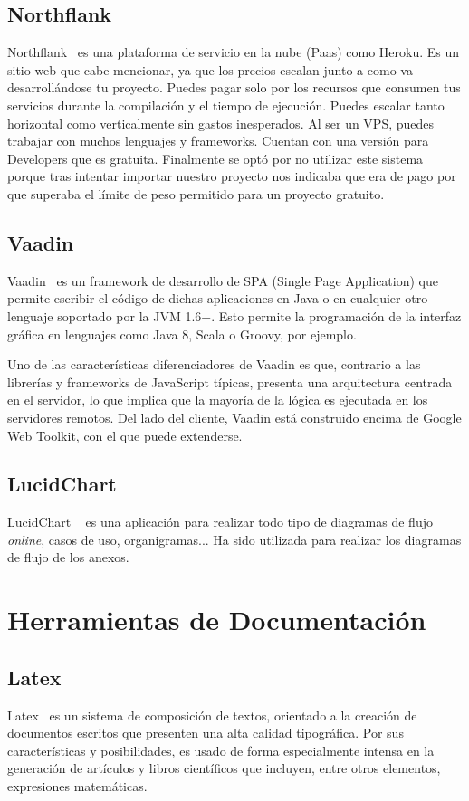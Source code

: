 \subsection{Northflank}
Northflank~\cite{Northflank} es una plataforma de servicio en la nube (Paas) como Heroku. Es un sitio web que cabe mencionar, ya que los precios escalan junto a como va desarrollándose tu proyecto. Puedes pagar solo por los recursos que consumen tus servicios durante la compilación y el tiempo de ejecución. Puedes escalar tanto horizontal como verticalmente sin gastos inesperados. Al ser un VPS, puedes trabajar con muchos lenguajes y frameworks. Cuentan con una versión para Developers que es gratuita. 
Finalmente se optó por no utilizar este sistema porque tras intentar importar nuestro proyecto nos indicaba que era de pago por que superaba el límite de peso permitido para un proyecto gratuito.

\subsection{Vaadin}
Vaadin~\cite{Vaadin} es un framework de desarrollo de SPA (Single Page Application) que permite escribir el código de dichas aplicaciones en Java o en cualquier otro lenguaje soportado por la JVM 1.6+. Esto permite la programación de la interfaz gráfica en lenguajes como Java 8, Scala o Groovy, por ejemplo.

Uno de las características diferenciadores de Vaadin es que, contrario a las librerías y frameworks de JavaScript típicas, presenta una arquitectura centrada en el servidor, lo que implica que la mayoría de la lógica es ejecutada en los servidores remotos. Del lado del cliente, Vaadin está construido encima de Google Web Toolkit, con el que puede extenderse.

\subsection{LucidChart}

LucidChart ~\cite{LucidChart} es una aplicación para realizar todo tipo de diagramas de flujo \emph{online}, casos de uso, organigramas... 
Ha sido utilizada para realizar los diagramas de flujo de los anexos.

\section{Herramientas de Documentación}

\subsection{Latex}
 Latex~\cite{latex} es un sistema de composición de textos, orientado a la creación de documentos escritos que presenten una alta calidad tipográfica. Por sus características y posibilidades, es usado de forma especialmente intensa en la generación de artículos y libros científicos que incluyen, entre otros elementos, expresiones matemáticas.
 
